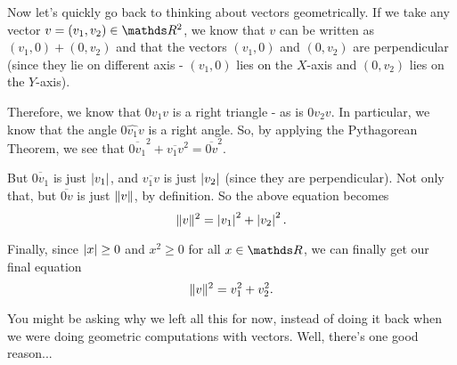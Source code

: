 Now let's quickly go back to thinking about vectors geometrically. If we take any vector $v=(v_1,v_2)\in \R^2$, we know that $v$ can be written as $(v_1,0)+(0,v_2)$ and that the vectors $(v_1,0)$ and $(0,v_2)$ are perpendicular (since they lie on different axis - $(v_1,0)$ lies on the $X$-axis and $(0,v_2)$ lies on the $Y$-axis).

Therefore, we know that $0v_1v$ is a right triangle - as is $0v_2v$. In particular, we know that the angle $0\hat{v_1}v$ is a right angle. So, by applying the Pythagorean Theorem, we see that $\overline{0v_1}^2+\overline{v_1v}^2=\overline{0v}^2$.

But $\overline{0v_1}$ is just $\left\vert v_1\right\vert$, and $\overline{v_1v}$ is just $\left\vert v_2\right\vert$ (since they are perpendicular). Not only that, but $\overline{0v}$ is just $\lVert v\rVert$, by definition. So the above equation becomes
\[\lVert v\rVert^2=\left\vert v_1\right\vert^2+\left\vert v_2\right\vert^2.\]

Finally, since $\left\vert x\right\vert\geq0$ and $x^2\geq0$ for all $x\in \R$, we can finally get our final equation
\[\lVert v\rVert^2=v_1^2+v_2^2.\]

You might be asking why we left all this for now, instead of doing it back when we were doing geometric computations with vectors. Well, there's one good reason...

